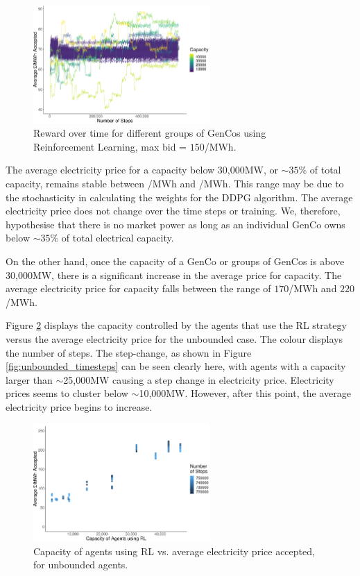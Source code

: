 \begin{figure}
	\centering
	\includegraphics[width=0.6\textwidth]{Chapter7/Figures/results/bounded_results.pdf}
	\caption{Reward over time for different groups of GenCos using Reinforcement Learning, max bid = \textsterling $150$/MWh.}
	\label{fig:bounded_timesteps}
\end{figure}



The average electricity price for a capacity below 30,000MW, or ${\sim35\%}$ of total capacity, remains stable between /MWh and /MWh. This range may be due to the stochasticity in calculating the weights for the DDPG algorithm. The average electricity price does not change over the time steps or training. We, therefore, hypothesise that there is no market power as long as an individual GenCo owns below ${\sim}35\%$ of total electrical capacity. 

On the other hand, once the capacity of a GenCo or groups of GenCos is above 30,000MW, there is a significant increase in the average price for capacity. The average electricity price for capacity falls between the range of  \textsterling$170$/MWh and \textsterling$220$/MWh. 

Figure \ref{fig:unbounded_results_scatter} displays the capacity controlled by the agents that use the RL strategy versus the average electricity price for the unbounded case. The colour displays the number of steps. The step-change, as shown in Figure \ref{fig:unbounded_timesteps} can be seen clearly here, with agents with a capacity larger than ${\sim}$25,000MW causing a step change in electricity price. Electricity prices seems to cluster below ${\sim}$10,000MW. However, after this point, the average electricity price begins to increase.



\begin{figure}
	\centering
	\includegraphics[width=0.6\textwidth]{Chapter7/Figures/results/unbounded_results_scatter.pdf}
	\caption{Capacity of agents using RL vs. average electricity price accepted, for unbounded agents.}
	\label{fig:unbounded_results_scatter}
\end{figure}



